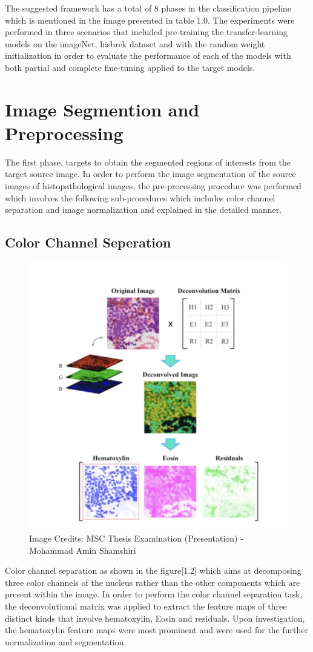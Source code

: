 The suggested framework has a total of 8 phases in the classification pipeline which is mentioned in the image presented in table 1.0. The experiments were performed in three scenarios that included pre-training the transfer-learning models on the imageNet, hisbrek dataset and with the random weight initialization in order to evaluate the performance
of each of the models with both partial and complete fine-tuning applied to the target models.

\section{Image Segmention and Preprocessing}
The first phase, targets to obtain the segmented regions of interests from the target source image. 
In order to perform the image segmentation of the source images of 
histopathological images, the pre-processing procedure was performed which involves 
the following sub-procedures which includes color channel separation and 
image normalization and explained in the detailed manner.
\pagebreak
\subsection{Color Channel Seperation}
\begin{figure}[!htp]
    \centering
    \includegraphics[scale=0.75]{assets/pre-processing.png}
    \caption{Image Credits: MSC Thesis Examination (Presentation) - Mohammad Amin Shamshiri}
\end{figure}
Color channel separation as shown in the figure[1.2] which aims at decomposing three color channels of the nucleus rather than the other components which are present within the image. In order to perform the color channel separation task, 
the deconvolutional matrix was applied to extract the feature maps of three distinct kinds that involve hematoxylin, Eosin and residuals. Upon investigation, the hematoxylin feature maps were most prominent and were used for the further normalization and segmentation. 


